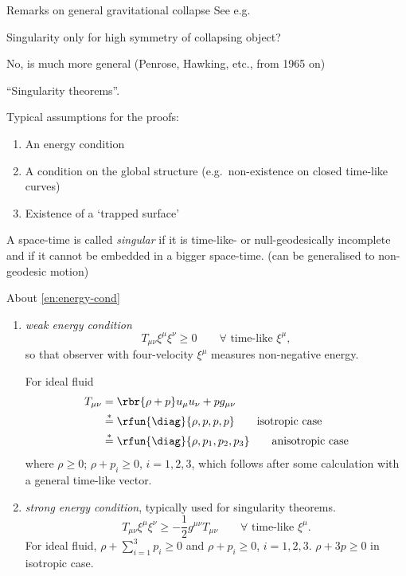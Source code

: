 \begin{namedrem}{Remarks on general gravitational collapse}
See e.g.\ \cite{StephenHawking2015,Hawking2000Raum}

Singularity only for high symmetry of collapsing object?

No, is much more general (Penrose, Hawking, etc., from 1965 on)

``Singularity theorems''.

Typical assumptions for the proofs:
\begin{enumerate}
\item An energy condition
\label{en:energy-cond}
\item A condition on the global structure
(e.g.\ non-existence on closed time-like curves)
\item Existence of a `trapped surface'
\label{en:trapped-surf}
\end{enumerate}

\begin{nameddef}{ }
A space-time is called \emph{singular} if it is time-like- or null-geodesically
incomplete and if it cannot be embedded in a bigger space-time.
(can be generalised to non-geodesic motion)
\end{nameddef} %

\begin{namedrem}{About \cref{en:energy-cond}}
\begin{enumerate}[label=\alph*]
\item
\emph{weak energy condition}
\begin{equation}
T_{\mu\nu}\xi^\mu\xi^\nu \ge 0\qquad \forall \text{ time-like } \xi^\mu,
\end{equation}
so that observer with four-velocity $\xi^\mu$ measures non-negative energy.

For ideal fluid
\begin{align}
T_{\mu\nu} &= \rbr{\rho+p}u_\mu u_\nu + pg_{\mu\nu} \\
&\overset{*}{=} \rfun{\diag}{\rho,p,p,p}\qquad\text{isotropic case} \\
&\overset{*}{=} \rfun{\diag}{\rho,p_1,p_2,p_3}
\qquad\text{anisotropic case} \\
\end{align}
where $\rho \ge 0$; $\rho + p_i \ge 0$, $i = 1, 2, 3$, which follows after some
calculation with a general time-like vector.

\item \emph{strong energy condition}, typically used for singularity theorems.
\begin{equation}
T_{\mu\nu}\xi^\mu\xi^\nu \ge -\frac{1}{2} g^{\mu\nu}T_{\mu\nu}
\qquad \forall \text{ time-like } \xi^\mu.
\end{equation}
For ideal fluid, $\rho + \sum_{i = 1}^3 p_i \ge 0$ and $\rho + p_i \ge 0$, $i
 = 1, 2, 3$. $\rho + 3p \ge 0$ in isotropic case.


\end{enumerate}
\end{namedrem}
\end{namedrem}
